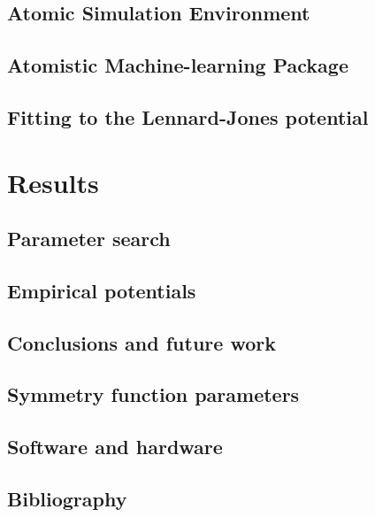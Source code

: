 \documentclass[12pt]{report}
\begin{document}
\chapter{Atomic Simulation Environment}


\chapter{Atomistic Machine-learning Package}


\chapter{Fitting to the Lennard-Jones potential}


\part{Results}

\chapter{Parameter search}\label{chap:parameter-search}


\chapter{Empirical potentials}


\chapter{Conclusions and future work}


\begin{appendices}

\chapter{Symmetry function parameters}\label{chap:appendix-a}


\chapter{Software and hardware}


\chapter{Bibliography}
\printbibliography[heading=none]

\end{appendices}
\end{document}
